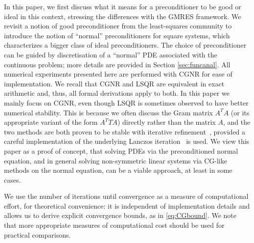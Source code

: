\documentclass[hidelinks,onefignum,onetabnum]{siamart220329}
\newcommand{\bb}[1]{#1}
\begin{document}
In this paper, we first discuss what it means for a preconditioner to be good or ideal in this context, stressing the differences with the GMRES framework.
We revisit a notion of good preconditioner from the least-squares community to introduce the notion of ``normal'' preconditioners for square systems, which characterizes a bigger class of ideal preconditioners.
The choice of preconditioner can be guided by discretisation of a “normal” PDE associated with the continuous problem; more details are provided in Section \ref{sec:funcanal}.
All numerical experiments presented here are performed with CGNR for ease of implementation. We recall that CGNR and LSQR are equivalent in exact arithmetic and, thus, all formal derivations apply to both.
In this paper we mainly focus on CGNR, even though LSQR is sometimes observed to have better numerical stability. This is because we often discuss the Gram matrix $A^TA$ (or its appropriate variant of the form $A^TTA$) directly rather than the matrix $A$, and the two methods are both proven to be stable with iterative refinement~\cite{epperly2025}, provided a careful implementation of the underlying Lanczos iteration~\cite{musco2018stability} is used.
We view this paper as a proof of concept, that solving PDEs  via the preconditioned normal equation, and in general solving non-symmetric linear systems via CG-like methods on the normal equation, can be a viable approach, at least in some cases.


\bb{We use the number of iterations until convergence as a measure of computational effort, for theoretical convenience: it is independent of implementation details and allows us to derive explicit convergence bounds, as in \eqref{eq:CGbound}. We note that more appropriate measures of computational cost should be used for practical comparisons.}
\end{document}
